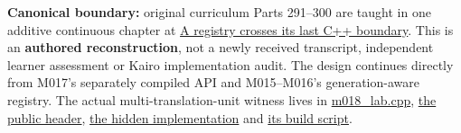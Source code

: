 \hypertarget{appendix-fd090d982a15-m018-parts-291300-the-same-asset-service-becomes-a-typed-hidden-and-measurable-engine-api}{}

\textbf{Canonical boundary:} original curriculum Parts 291--300 are taught in one additive continuous chapter at \hyperref[01-foundations-i-ch007-a-registry-crosses-its-last-c-boundary-hidden-implementation-typed-identity-and-measured-abstraction-cost]{A registry crosses its last C++ boundary}. This is an \textbf{authored reconstruction}, not a newly received transcript, independent learner assessment or Kairo implementation audit. The design continues directly from M017's separately compiled API and M015--M016's generation-aware registry. The actual multi-translation-unit witness lives in \hyperref[source-file-8aedc3fdcd10c91971507448]{m018\_lab.cpp}, \hyperref[source-file-0529c78555b675a2ae111228]{the public header}, \hyperref[source-file-04abded74b7e03edc5dcf870]{the hidden implementation} and \hyperref[source-file-c936569afa19be638ec87991]{its build script}.

